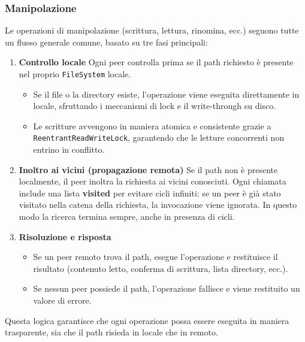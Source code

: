 \documentclass[11pt]{article}
\begin{document}
\subsubsection{Manipolazione}
\label{sec:org45c1683}
Le operazioni di manipolazione (scrittura, lettura, rinomina, ecc.) seguono tutte
un flusso generale comune, basato su tre fasi principali:

\begin{enumerate}
\item \textbf{\textbf{Controllo locale}}
Ogni peer controlla prima se il path richiesto è presente nel proprio
\texttt{FileSystem} locale.
\begin{itemize}
\item Se il file o la directory esiste, l’operazione viene eseguita direttamente
in locale, sfruttando i meccanismi di lock e il write-through su disco.
\item Le scritture avvengono in maniera atomica e consistente grazie a
\texttt{ReentrantReadWriteLock}, garantendo che le letture concorrenti
non entrino in conflitto.
\end{itemize}

\item \textbf{\textbf{Inoltro ai vicini (propagazione remota)}}
Se il path non è presente localmente, il peer inoltra la richiesta
ai vicini conosciuti.
Ogni chiamata include una lista \textbf{visited} per evitare cicli infiniti:
se un peer è già stato visitato nella catena della richiesta, la
invocazione viene ignorata.
In questo modo la ricerca termina sempre, anche in presenza di cicli.

\item \textbf{\textbf{Risoluzione e risposta}}
\begin{itemize}
\item Se un peer remoto trova il path, esegue l’operazione e restituisce
il risultato (contenuto letto, conferma di scrittura, lista directory, ecc.).
\item Se nessun peer possiede il path, l’operazione fallisce e viene restituito
un valore di errore.
\end{itemize}
\end{enumerate}
Questa logica garantisce che ogni operazione possa essere eseguita
in maniera trasparente, sia che il path risieda in locale che in remoto.
\end{document}

